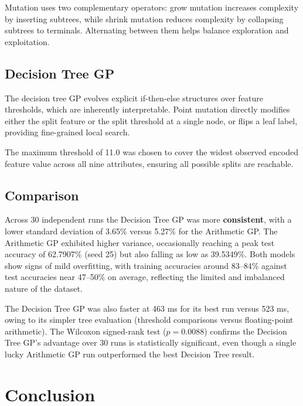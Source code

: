 \documentclass[12pt,a4paper]{article}
\begin{document}
Mutation uses two complementary operators: grow mutation increases complexity by inserting subtrees, while shrink mutation reduces complexity by collapsing subtrees to terminals. Alternating between them helps balance exploration and exploitation.

\subsection{Decision Tree GP}

The decision tree GP evolves explicit if-then-else structures over feature thresholds, which are inherently interpretable. Point mutation directly modifies either the split feature or the split threshold at a single node, or flips a leaf label, providing fine-grained local search.

The maximum threshold of 11.0 was chosen to cover the widest observed encoded feature value across all nine attributes, ensuring all possible splits are reachable.

\subsection{Comparison}

Across 30 independent runs the Decision Tree GP was more \textbf{consistent}, with a lower standard deviation of 3.65\% versus 5.27\% for the Arithmetic GP. The Arithmetic GP exhibited higher variance, occasionally reaching a peak test accuracy of 62.7907\% (seed 25) but also falling as low as 39.5349\%. Both models show signs of mild overfitting, with training accuracies around 83--84\% against test accuracies near 47--50\% on average, reflecting the limited and imbalanced nature of the dataset.

The Decision Tree GP was also faster at 463 ms for its best run versus 523 ms, owing to its simpler tree evaluation (threshold comparisons versus floating-point arithmetic). The Wilcoxon signed-rank test ($p = 0.0088$) confirms the Decision Tree GP's advantage over 30 runs is statistically significant, even though a single lucky Arithmetic GP run outperformed the best Decision Tree result.

\section{Conclusion}
\end{document}
